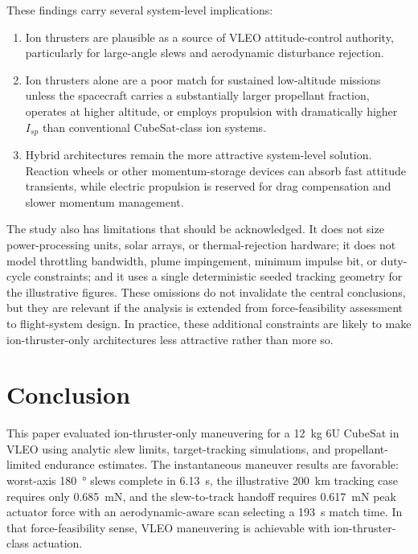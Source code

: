 \documentclass[conf]{new-aiaa}
\begin{document}
These findings carry several system-level implications:
\begin{enumerate}
    \item Ion thrusters are plausible as a source of VLEO attitude-control authority, particularly for large-angle slews and aerodynamic disturbance rejection.
    \item Ion thrusters alone are a poor match for sustained low-altitude missions unless the spacecraft carries a substantially larger propellant fraction, operates at higher altitude, or employs propulsion with dramatically higher $I_{sp}$ than conventional CubeSat-class ion systems.
    \item Hybrid architectures remain the more attractive system-level solution. Reaction wheels or other momentum-storage devices can absorb fast attitude transients, while electric propulsion is reserved for drag compensation and slower momentum management.
\end{enumerate}

The study also has limitations that should be acknowledged. It does not size power-processing units, solar arrays, or thermal-rejection hardware; it does not model throttling bandwidth, plume impingement, minimum impulse bit, or duty-cycle constraints; and it uses a single deterministic seeded tracking geometry for the illustrative figures. These omissions do not invalidate the central conclusions, but they are relevant if the analysis is extended from force-feasibility assessment to flight-system design. In practice, these additional constraints are likely to make ion-thruster-only architectures less attractive rather than more so.

\section{Conclusion} \label{sec:conclusion}

This paper evaluated ion-thruster-only maneuvering for a \SI{12}{\kilogram} 6U CubeSat in VLEO using analytic slew limits, target-tracking simulations, and propellant-limited endurance estimates. The instantaneous maneuver results are favorable: worst-axis \SI{180}{\degree} slews complete in \SI{6.13}{\second}, the illustrative \SI{200}{\kilo\meter} tracking case requires only \SI{0.685}{\milli\newton}, and the slew-to-track handoff requires \SI{0.617}{\milli\newton} peak actuator force with an aerodynamic-aware scan selecting a \SI{193}{\second} match time. In that force-feasibility sense, VLEO maneuvering is achievable with ion-thruster-class actuation.
\end{document}
